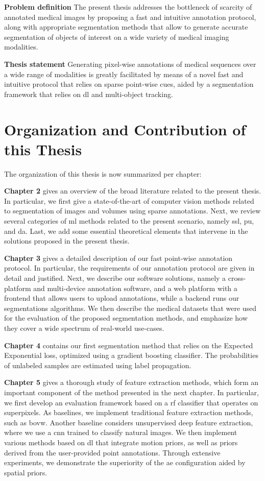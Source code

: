 \textbf{Problem definition}
The present thesis addresses the bottleneck of scarcity of annotated medical images by proposing a fast and intuitive annotation protocol, along with appropriate segmentation methods that allow to generate accurate segmentation of objects of interest on a wide variety of medical imaging modalities.

\textbf{Thesis statement}
Generating pixel-wise annotations of medical sequences over a wide range of modalities is greatly facilitated by means of a novel fast and intuitive protocol that relies on sparse point-wise cues, aided by a segmentation framework that relies on \gls{dl} and multi-object tracking.

\section{Organization and Contribution of this Thesis}
The organization of this thesis is now summarized per chapter:

\textbf{Chapter 2} gives an overview of the broad literature related to the present thesis.
In particular, we first give a state-of-the-art of computer vision methods related to segmentation of images and volumes using sparse annotations.
Next, we review several categories of \gls{ml} methods related to the present scenario, namely \gls{ssl}, \gls{pu}, and \gls{da}.
Last, we add some essential theoretical elements that intervene in the solutions proposed in the present thesis.

\textbf{Chapter 3} gives a detailed description of our fast point-wise annotation protocol.
In particular, the requirements of our annotation protocol are given in detail and justified.
Next, we describe our software solutions, namely a cross-platform and multi-device annotation software, and a web platform with a frontend that allows users to upload annotations, while a backend runs our segmentations algorithms.
We then describe the medical datasets that were used for the evaluation of the proposed segmentation methods, and emphasize how they cover a wide spectrum of real-world use-cases.

\textbf{Chapter 4} contains our first segmentation method that relies on the Expected Exponential loss, optimized using a gradient boosting classifier. The probabilities of unlabeled samples are estimated using label propagation.

\textbf{Chapter 5} gives a thorough study of feature extraction methods, which form an important component of the method presented in the next chapter.
In particular, we first develop an evaluation framework based on a \gls{rf} classifier that operates on superpixels.
As baselines, we implement traditional feature extraction methods, such as \gls{bovw}.
Another baseline considers unsupervised deep feature extraction, where we use a \gls{cnn} trained to classify natural images.
We then implement various methods based on \gls{dl} that integrate motion priors, as well as priors derived from the user-provided point annotations.
Through extensive experiments, we demonstrate the superiority of the \gls{ae} configuration aided by spatial priors.

